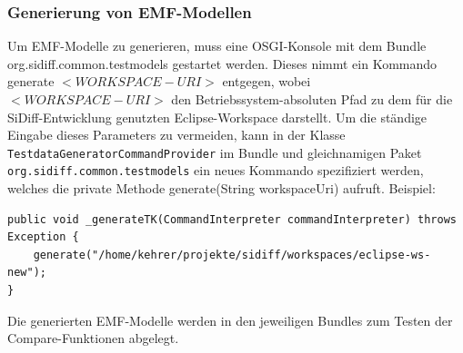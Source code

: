\subsubsection{Generierung von EMF-Modellen}
Um EMF-Modelle zu generieren, muss eine OSGI-Konsole mit dem Bundle org.sidiff.common.testmodels gestartet werden. Dieses nimmt ein Kommando generate $<WORKSPACE-URI>$ entgegen, wobei $<WORKSPACE-URI>$ den Betriebssystem-absoluten Pfad zu dem für die SiDiff-Entwicklung genutzten Eclipse-Workspace darstellt. Um die ständige Eingabe dieses Parameters zu vermeiden, kann in der Klasse \texttt{TestdataGeneratorCommandProvider} im Bundle und gleichnamigen Paket \texttt{org.sidiff.common.testmodels} ein neues Kommando spezifiziert werden, welches die private Methode generate(String workspaceUri) aufruft. Beispiel: 
\begin{lstlisting}
public void _generateTK(CommandInterpreter commandInterpreter) throws Exception {
	generate("/home/kehrer/projekte/sidiff/workspaces/eclipse-ws-new");
}
\end{lstlisting}

Die generierten EMF-Modelle werden in den jeweiligen Bundles zum Testen der Compare-Funktionen abgelegt.